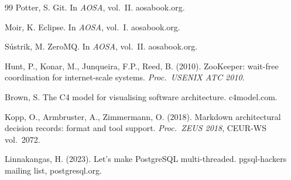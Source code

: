\documentclass[11pt,oneside]{article}
\theoremstyle{definition}
\begin{document}
\begin{thebibliography}{99}
 Potter, S. Git. In \emph{AOSA}, vol.~II. aosabook.org.

 Moir, K. Eclipse. In \emph{AOSA}, vol.~I. aosabook.org.

 Sústrik, M. ZeroMQ. In \emph{AOSA}, vol.~II. aosabook.org.

 Hunt, P., Konar, M., Junqueira, F.P., Reed, B. (2010). ZooKeeper: wait-free
coordination for internet-scale systems. \emph{Proc.\ USENIX ATC 2010}.

 Brown, S. The C4 model for visualising software architecture. c4model.com.

 Kopp, O., Armbruster, A., Zimmermann, O. (2018). Markdown architectural
decision records: format and tool support. \emph{Proc.\ ZEUS 2018}, CEUR-WS vol.~2072.

 Linnakangas, H. (2023). Let's make PostgreSQL multi-threaded.
pgsql-hackers mailing list, postgresql.org.

\end{thebibliography}
\end{document}
